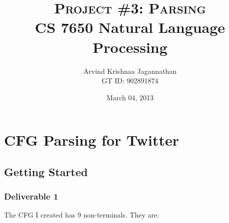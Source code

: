 \documentclass[10pt, letter]{article}
\newcommand{\doctitle}{%
CS 7650 Natural Language Processing}
\begin{document}
\title{\textsc{Project \#3: Parsing} \\ \textbf{\doctitle}}
  \author {Arvind Krishnaa Jagannathan \\ GT ID: 902891874}
   \date{March 04, 2013}
\maketitle
\section{CFG Parsing for Twitter}
\subsection{Getting Started}
\subsubsection*{Deliverable 1}
The CFG I created has 9 non-terminals. They are: 
\end{document}
